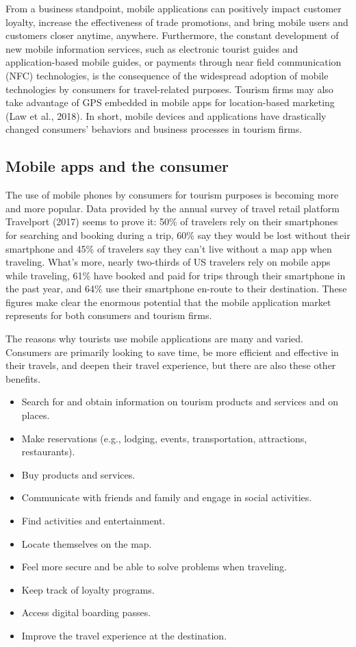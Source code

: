 \documentclass[
  letterpaper,
  DIV=11,
  numbers=noendperiod]{scrreprt}
\begin{document}
From a business standpoint, mobile applications can positively impact
customer loyalty, increase the effectiveness of trade promotions, and
bring mobile users and customers closer anytime, anywhere. Furthermore,
the constant development of new mobile information services, such as
electronic tourist guides and application-based mobile guides, or
payments through near field communication (NFC) technologies, is the
consequence of the widespread adoption of mobile technologies by
consumers for travel-related purposes. Tourism firms may also take
advantage of GPS embedded in mobile apps for location-based marketing
(Law et al., 2018). In short, mobile devices and applications have
drastically changed consumers' behaviors and business processes in
tourism firms.

\hypertarget{mobile-apps-and-the-consumer}{%
\subsection{Mobile apps and the
consumer}\label{mobile-apps-and-the-consumer}}

The use of mobile phones by consumers for tourism purposes is becoming
more and more popular. Data provided by the annual survey of travel
retail platform Travelport (2017) seems to prove it: 50\% of travelers
rely on their smartphones for searching and booking during a trip, 60\%
say they would be lost without their smartphone and 45\% of travelers
say they can't live without a map app when traveling. What's more,
nearly two-thirds of US travelers rely on mobile apps while traveling,
61\% have booked and paid for trips through their smartphone in the past
year, and 64\% use their smartphone en-route to their destination. These
figures make clear the enormous potential that the mobile application
market represents for both consumers and tourism firms.

The reasons why tourists use mobile applications are many and varied.
Consumers are primarily looking to save time, be more efficient and
effective in their travels, and deepen their travel experience, but
there are also these other benefits.

\begin{itemize}
\item
  Search for and obtain information on tourism products and services and
  on places.
\item
  Make reservations (e.g., lodging, events, transportation, attractions,
  restaurants).
\item
  Buy products and services.
\item
  Communicate with friends and family and engage in social activities.
\item
  Find activities and entertainment.
\item
  Locate themselves on the map.
\item
  Feel more secure and be able to solve problems when traveling.
\item
  Keep track of loyalty programs.
\item
  Access digital boarding passes.
\item
  Improve the travel experience at the destination.
\end{itemize}
\end{document}
